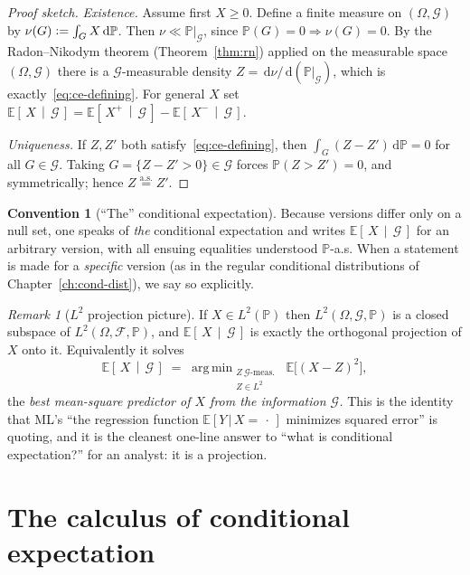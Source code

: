 \documentclass[11pt,oneside]{report}
\theoremstyle{plain}
\theoremstyle{definition}
\newtheorem{convention}[theorem]{Convention}
\theoremstyle{remark}
\newtheorem{remark}[theorem]{Remark}
\newcommand{\Prob}{\mathbb{P}}
\newcommand{\E}{\mathbb{E}}
\newcommand{\dd}{\,\mathrm{d}}
\newcommand{\Fcal}{\mathcal{F}}
\newcommand{\Gcal}{\mathcal{G}}
\newcommand{\eqas}{\overset{\text{a.s.}}{=}}
\newcommand{\defeq}{\vcentcolon=}
\newcommand{\given}{\,\vert\,}
\DeclareMathOperator*{\argmin}{arg\,min}
\newcommand{\cE}[2]{\E\!\left[\,#1 \,\middle|\, #2\,\right]}
\numberwithin{equation}{chapter}
\begin{document}
\begin{proof}[Proof sketch]
\emph{Existence.} Assume first $X\ge 0$. Define a finite measure on
$(\Omega,\Gcal)$ by $\nu(G)\defeq\int_G X\dd\Prob$. Then $\nu\ll\Prob|_\Gcal$,
since $\Prob(G)=0\Rightarrow\nu(G)=0$. By the Radon--Nikodym theorem
(Theorem~\ref{thm:rn}) applied on the measurable space $(\Omega,\Gcal)$
there is a $\Gcal$-measurable density $Z=\dd\nu/\dd(\Prob|_\Gcal)$, which is
exactly~\eqref{eq:ce-defining}. For general $X$ set
$\cE{X}{\Gcal}=\cE{X^+}{\Gcal}-\cE{X^-}{\Gcal}$.

\emph{Uniqueness.} If $Z,Z'$ both satisfy~\eqref{eq:ce-defining}, then
$\int_G(Z-Z')\dd\Prob=0$ for all $G\in\Gcal$. Taking
$G=\{Z-Z'>0\}\in\Gcal$ forces $\Prob(Z>Z')=0$, and symmetrically; hence
$Z\eqas Z'$.
\end{proof}

\begin{convention}[``The'' conditional expectation]
Because versions differ only on a null set, one speaks of \emph{the}
conditional expectation and writes $\cE{X}{\Gcal}$ for an arbitrary
version, with all ensuing equalities understood $\Prob$-a.s. When a
statement is made for a \emph{specific} version (as in the regular
conditional distributions of Chapter~\ref{ch:cond-dist}), we say so
explicitly.
\end{convention}

\begin{remark}[$L^2$ projection picture]\label{rem:l2-proj}
If $X\in L^2(\Prob)$ then $L^2(\Omega,\Gcal,\Prob)$ is a closed subspace of
$L^2(\Omega,\Fcal,\Prob)$, and $\cE{X}{\Gcal}$ is exactly the orthogonal
projection of $X$ onto it. Equivalently it solves
\begin{equation}
  \cE{X}{\Gcal}\;=\;\argmin_{\substack{Z\ \Gcal\text{-meas.}\\ Z\in L^2}}
     \;\E\bigl[(X-Z)^2\bigr],
\end{equation}
the \emph{best mean-square predictor of $X$ from the information
$\Gcal$.} This is the identity that ML's ``the regression function
$\E[Y\given X{=}\,\cdot\,]$ minimizes squared error'' is quoting, and it is
the cleanest one-line answer to ``what is conditional expectation?'' for
an analyst: it is a projection.
\end{remark}

\section{The calculus of conditional expectation}\label{sec:ce-calculus}
\end{document}
